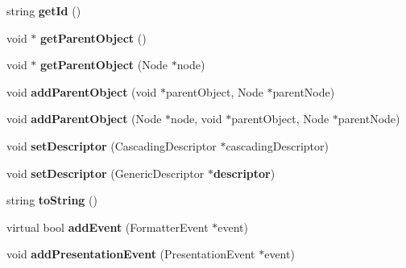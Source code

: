 \begin{CompactItemize}
\item 
string \textbf{getId} ()\label{classbr_1_1pucrio_1_1telemidia_1_1ginga_1_1ncl_1_1model_1_1components_1_1ExecutionObject_bba5652b12c4d6161f860eb44d5789d8}

\item 
void $\ast$ \textbf{getParentObject} ()\label{classbr_1_1pucrio_1_1telemidia_1_1ginga_1_1ncl_1_1model_1_1components_1_1ExecutionObject_96f639a8624dec4b6eeedbeaf5fbb04d}

\item 
void $\ast$ \textbf{getParentObject} (Node $\ast$node)\label{classbr_1_1pucrio_1_1telemidia_1_1ginga_1_1ncl_1_1model_1_1components_1_1ExecutionObject_a11838510897b98237b93e30ec6e7fa6}

\item 
void \textbf{addParentObject} (void $\ast$parentObject, Node $\ast$parentNode)\label{classbr_1_1pucrio_1_1telemidia_1_1ginga_1_1ncl_1_1model_1_1components_1_1ExecutionObject_016aca38ebc82a870e279ae4ee591f33}

\item 
void \textbf{addParentObject} (Node $\ast$node, void $\ast$parentObject, Node $\ast$parentNode)\label{classbr_1_1pucrio_1_1telemidia_1_1ginga_1_1ncl_1_1model_1_1components_1_1ExecutionObject_95eacc05e67b16b844a73f06d899dc7c}

\item 
void \textbf{setDescriptor} (CascadingDescriptor $\ast$cascadingDescriptor)\label{classbr_1_1pucrio_1_1telemidia_1_1ginga_1_1ncl_1_1model_1_1components_1_1ExecutionObject_0fe9b6bd183081cfb8496887f809dd06}

\item 
void \textbf{setDescriptor} (GenericDescriptor $\ast${\bf descriptor})\label{classbr_1_1pucrio_1_1telemidia_1_1ginga_1_1ncl_1_1model_1_1components_1_1ExecutionObject_f972a076db0e005c83bae1510076860b}

\item 
string \textbf{toString} ()\label{classbr_1_1pucrio_1_1telemidia_1_1ginga_1_1ncl_1_1model_1_1components_1_1ExecutionObject_2a35b0d68ef09ad99a22fa8563e1797f}

\item 
virtual bool \textbf{addEvent} (FormatterEvent $\ast$event)\label{classbr_1_1pucrio_1_1telemidia_1_1ginga_1_1ncl_1_1model_1_1components_1_1ExecutionObject_f68c1e0efc7090085cd06961986dbd41}

\item 
void \textbf{addPresentationEvent} (PresentationEvent $\ast$event)\label{classbr_1_1pucrio_1_1telemidia_1_1ginga_1_1ncl_1_1model_1_1components_1_1ExecutionObject_25867e0300ec8a2b4c60b2b6ee816620}


\end{CompactItemize}
